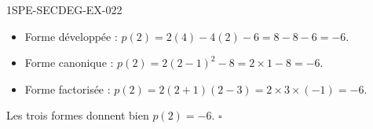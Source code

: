 \begin{corrige}{1SPE-SECDEG-EX-022}

\begin{itemize}
  \item Forme développée : $p(2) = 2(4) - 4(2) - 6 = 8 - 8 - 6 = -6$.
  \item Forme canonique : $p(2) = 2(2-1)^2 - 8 = 2 \times 1 - 8 = -6$.
  \item Forme factorisée : $p(2) = 2(2+1)(2-3) = 2 \times 3 \times (-1) = -6$.
\end{itemize}

Les trois formes donnent bien $p(2) = -6$. \hfill $\square$

\end{corrige}
